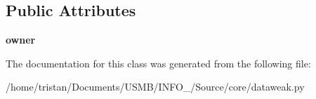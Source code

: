 \subsection*{Public Attributes}
\begin{DoxyCompactItemize}
\item 
\mbox{\label{classSource_1_1core_1_1dataweak_1_1WeakRefSet_aad79e1c6ef86604ddbad56c37bc896bb}} 
{\bfseries owner}
\end{DoxyCompactItemize}


The documentation for this class was generated from the following file\+:\begin{DoxyCompactItemize}
\item 
/home/tristan/\+Documents/\+U\+S\+M\+B/\+I\+N\+F\+O\+\_/\+Source/core/dataweak.\+py\end{DoxyCompactItemize}
